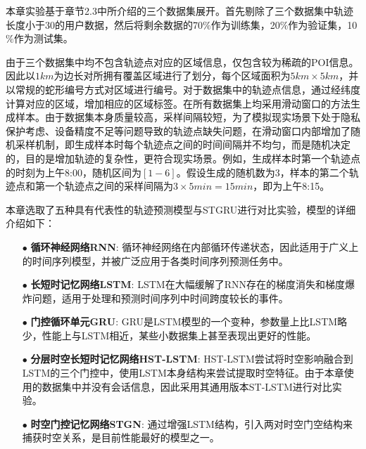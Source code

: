 \documentclass[master]{thesis-uestc}
\begin{document}
本章实验基于章节2.3中所介绍的三个数据集展开。首先剔除了三个数据集中轨迹长度小于30的用户数据，然后将剩余数据的70$\%$作为训练集，20$\%$作为验证集，10$\%$作为测试集。

由于三个数据集中均不包含轨迹点对应的区域信息，仅包含较为稀疏的POI信息。因此以$1km$为边长对所拥有覆盖区域进行了划分，每个区域面积为$5km \times 5km$，并以常规的蛇形编号方式对区域进行编号。对于数据集中的轨迹点信息，通过经纬度计算对应的区域，增加相应的区域标签。在所有数据集上均采用滑动窗口的方法生成样本。由于数据集本身质量较高，采样间隔较短，为了模拟现实场景下处于隐私保护考虑、设备精度不足等问题导致的轨迹点缺失问题，在滑动窗口内部增加了随机采样机制，即生成样本时每个轨迹点之间的时间间隔并不均匀，而是随机决定的，目的是增加轨迹的复杂性，更符合现实场景。例如，生成样本时第一个轨迹点的时刻为上午8:00，随机区间为$[1-6]$。假设生成的随机数为3，样本的第二个轨迹点和第一个轨迹点之间的采样间隔为$3\times 5min=15min$，即为上午8:15。

本章选取了五种具有代表性的轨迹预测模型与STGRU进行对比实验，模型的详细介绍如下：
\begin{itemize}
\item[$\bullet$] \textbf{循环神经网络RNN}: 循环神经网络在内部循环传递状态，因此适用于广义上的时间序列模型，并被广泛应用于各类时间序列预测任务中。

\item[$\bullet$] \textbf{长短时记忆网络LSTM}: LSTM在大幅缓解了RNN存在的梯度消失和梯度爆炸问题，适用于处理和预测时间序列中时间跨度较长的事件。

\item[$\bullet$] \textbf{门控循环单元GRU}: GRU是LSTM模型的一个变种，参数量上比LSTM略少，性能上与LSTM相近，某些小数据集上甚至表现出更好的性能。

\item[$\bullet$] \textbf{分层时空长短时记忆网络HST-LSTM}: HST-LSTM尝试将时空影响融合到LSTM的三个门控中，使用LSTM本身结构来尝试提取时空特征。由于本章使用的数据集中并没有会话信息，因此采用其通用版本ST-LSTM进行对比实验。

\item[$\bullet$] \textbf{时空门控记忆网络STGN}: 通过增强LSTM结构，引入两对时空门空结构来捕获时空关系，是目前性能最好的模型之一。
\end{itemize}
\end{document}
